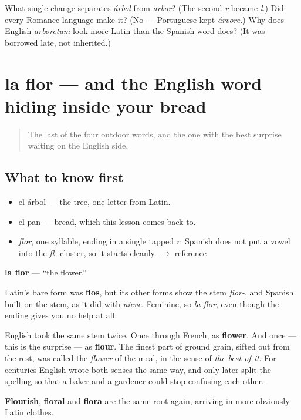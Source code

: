 \begin{tcolorbox}[breakable,colback=teal!4,colframe=teal!35!black,title={Before you move on}]
What single change separates \emph{árbol} from \emph{arbor}? (The second \emph{r} became \emph{l}.) Did every Romance language make it? (No — Portuguese kept \emph{árvore}.) Why does English \emph{arboretum} look more Latin than the Spanish word does? (It was borrowed late, not inherited.)
\end{tcolorbox}
\section[la flor]{la flor — and the English word hiding inside your bread}

\label{lesson:ES-C278-flor}



\begin{quote}
The last of the four outdoor words, and the one with the best surprise waiting on the English side.
\end{quote}

\subsection*{What to know first}
\begin{itemize}
\raggedright
  \item el árbol — the tree, one letter from Latin.
  \item el pan — bread, which this lesson comes back to.
\end{itemize}

\begin{sounds}
\begin{itemize}
\raggedright
  \item \emph{flor}, one syllable, ending in a single tapped \emph{r}. Spanish does not put a vowel into the \emph{fl-} cluster, so it starts cleanly. $\to$ reference
\end{itemize}
\end{sounds}

\begin{cousinweb}
\textbf{la flor} — \textquotedblleft{}the flower.\textquotedblright{}

Latin's bare form was \textbf{flos}, but its other forms show the stem \emph{flor-}, and Spanish built on the stem, as it did with \emph{nieve}. Feminine, so \emph{la flor}, even though the ending gives you no help at all.

English took the same stem twice. Once through French, as \textbf{flower}. And once — this is the surprise — as \textbf{flour}. The finest part of ground grain, sifted out from the rest, was called the \emph{flower} of the meal, in the sense of \emph{the best of it}. For centuries English wrote both senses the same way, and only later split the spelling so that a baker and a gardener could stop confusing each other.

\textbf{Flourish}, \textbf{floral} and \textbf{flora} are the same root again, arriving in more obviously Latin clothes.
\end{cousinweb}

